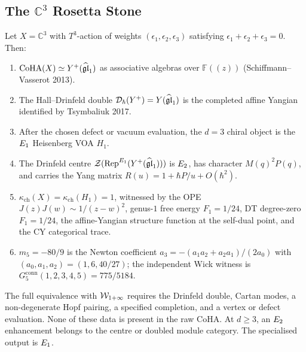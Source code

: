 \subsection*{The $\mathbb C^3$ Rosetta Stone}

\begin{theorem}
\label{wn:thm:c3-rosetta-nekrasov}
Let $X=\mathbb C^3$ with $T^3$-action of weights
$(\epsilon_1,\epsilon_2,\epsilon_3)$ satisfying
$\epsilon_1+\epsilon_2+\epsilon_3=0$. Then:
\begin{enumerate}[label=\textup{(\alph*)}]
\item $\mathrm{CoHA}(X)\simeq Y^+(\widehat{\mathfrak{gl}}_1)$ as associative algebras over
    $\mathbb F(\!(z)\!)$ (Schiffmann--Vasserot 2013).
\item The Hall--Drinfeld double
    $\mathcal D_\hbar(Y^+)=Y(\widehat{\mathfrak{gl}}_1)$ is the completed affine Yangian
    identified by Tsymbaliuk 2017.
\item After the chosen defect or vacuum evaluation, the $d=3$ chiral
    object is the $E_1$ Heisenberg VOA $H_1$.
\item The Drinfeld centre
    $\mathcal Z(\mathrm{Rep}^{E_1}(Y^+(\widehat{\mathfrak{gl}}_1)))$ is $E_2$, has
    character $M(q)^2P(q)$, and carries the Yang matrix
    $R(u)=1+\hbar P/u+O(\hbar^2)$.
\item $\kappa_{\mathrm{ch}}(X)=\kappa_{\mathrm{ch}}(H_1)=1$, witnessed
    by the OPE $J(z)J(w)\sim1/(z-w)^2$, genus-$1$ free energy
    $F_1=1/24$, DT degree-zero $F_1=1/24$, the affine-Yangian structure
    function at the self-dual point, and the CY categorical trace.
\item $m_5=-80/9$ is the Newton coefficient
    $a_3=-(a_1a_2+a_2a_1)/(2a_0)$ with
    $(a_0,a_1,a_2)=(1,6,40/27)$; the independent Wick witness is
    $G_5^{\mathrm{conn}}(1,2,3,4,5)=775/5184$.
\end{enumerate}
\end{theorem}

\begin{remark}
The full equivalence with $\mathcal{W}_{1+\infty}$ requires the Drinfeld double,
Cartan modes, a non-degenerate Hopf pairing, a specified completion,
and a vertex or defect evaluation. None of these data is present in
the raw CoHA. At $d\ge3$, an $E_2$ enhancement belongs to the centre
or doubled module category. The specialised output is $E_1$.
\end{remark}
